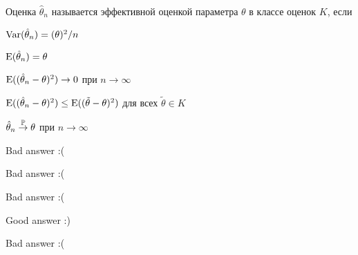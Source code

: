 
\begin{question}
Оценка \(\hat \theta_n\) называется эффективной оценкой параметра
\(\theta\) в классе оценок \(K\), если
\begin{answerlist}[2]
  \item \(\Var(\hat \theta_n)=(\theta)^2/n\)
  \item \(\E(\hat \theta_n)=\theta\)
  \item \(\E((\hat \theta_n - \theta)^2) \stackrel{}{\to} 0\) при
\(n\stackrel{}{\to} \infty\)
  \item \(\E((\hat \theta_n - \theta)^2) \leq \E((\tilde \theta - \theta)^2)\)
для всех \(\tilde \theta \in K\)
  \item \(\hat \theta_n \stackrel{\P}{\to} \theta\) при
\(n\stackrel{}{\to} \infty\)
\end{answerlist}
\end{question}

\begin{solution}
\begin{answerlist}
  \item Bad answer :(
  \item Bad answer :(
  \item Bad answer :(
  \item Good answer :)
  \item Bad answer :(
\end{answerlist}
\end{solution}

